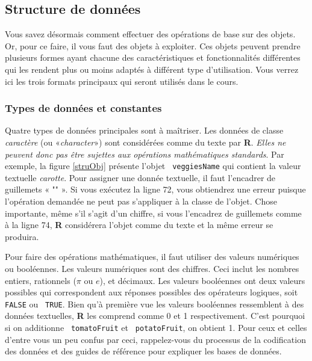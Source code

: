\documentclass[10.5pt,a4paper]{article}
\newcommand{\rcode}[1]{\texttt{\color{rstudio} #1}}
\begin{document}
  \subsection{Structure de données}
  Vous savez désormais comment effectuer des opérations de base sur des objets. Or, pour ce faire, il vous faut des objets à exploiter. Ces objets peuvent prendre plusieurs formes ayant chacune des caractéristiques et fonctionnalités différentes qui les rendent plus ou moins adaptés à différent type d'utilisation. Vous verrez ici les trois formats principaux qui seront utilisés dans le cours. 
  
    \subsubsection{Types de données et constantes}
    Quatre types de données principales sont à maîtriser. Les données de classe \emph{caractère} (ou «\emph{character}») sont considérées comme du texte par \textbf{R}. \emph{Elles ne peuvent donc pas être sujettes aux opérations mathématiques standards}. Par exemple, la figure \ref{struObj} présente l'objet \rcode{veggiesName} qui contient la valeur textuelle \emph{carotte}. Pour assigner une donnée textuelle, il faut l'encadrer de guillemets « "" ». Si vous exécutez la ligne 72, vous obtiendrez une erreur puisque l'opération demandée ne peut pas s'appliquer à la classe de l'objet. Chose importante, même s'il s'agit d'un chiffre, si vous l'encadrez de guillemets comme à la ligne 74, \textbf{R} considérera l'objet comme du texte et la même erreur se produira. 
    
    Pour faire des opérations mathématiques, il faut utiliser des valeurs numériques ou booléennes. Les valeurs numériques sont des chiffres. Ceci inclut les nombres entiers, rationnels ($\pi$ ou $e$), et décimaux. Les valeurs booléennes ont deux valeurs possibles qui correspondent aux réponses possibles des opérateurs logiques, soit \rcode{FALSE} ou \rcode{TRUE}. Bien qu'à première vue les valeurs booléennes ressemblent à des données textuelles, \textbf{R} les comprend comme 0 et 1 respectivement. C'est pourquoi si on additionne \rcode{tomatoFruit} et \rcode{potatoFruit}, on obtient 1. Pour ceux et celles d'entre vous un peu confus par ceci, rappelez-vous du processus de la codification des données et des guides de référence pour expliquer les bases de données.
    
\end{document}

